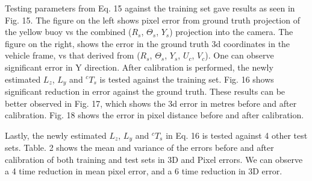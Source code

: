 \documentclass[a4paper]{IEEEtran}
\let\Theta\varTheta
\newcommand{\RSonar}{$\si{\textit{R}_{s}}$\xspace}
\newcommand{\ThetaSonar}{$\si{\Theta_{s}}$\xspace}
\newcommand{\UCamera}{$\si{\textit{U}_{c}}$\xspace}
\newcommand{\VCamera}{$\si{\textit{V}_{c}}$\xspace}
\newcommand{\YSonar}{$\si{\textit{Y}_{s}}$\xspace}
\begin{document}
Testing parameters from Eq. 15 against the training set gave results as seen in Fig. 15. The figure on the left shows pixel error from ground truth projection of the yellow buoy vs the combined (\RSonar, \ThetaSonar, \YSonar) projection into the camera. The figure on the right, shows the error in the ground truth 3d coordinates in the vehicle frame, vs that derived from (\RSonar, \ThetaSonar, \YSonar, \UCamera, \VCamera). One can observe significant error in Y direction. After calibration is performed, the newly estimated $L_{z}$, $L_{y}$ and $^{c}T_{s}$ is tested against the training set. Fig. 16 shows significant reduction in error against the ground truth. These results can be better observed in Fig. 17, which shows the 3d error in metres before and after calibration. Fig. 18 shows the error in pixel distance before and after calibration.

Lastly, the newly estimated $L_{z}$, $L_{y}$ and $^{c}T_{s}$ in Eq. 16 is tested against 4 other test sets. Table. 2 shows the mean and variance of the errors before and after calibration of both training and test sets in 3D and Pixel errors. We can observe a 4 time reduction in mean pixel error, and a 6 time reduction in 3D error.
\end{document}
